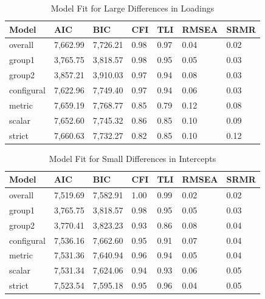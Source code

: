 \documentclass[
  man]{apa6}
\begin{document}
\begin{table}[tbp]

\begin{center}
\begin{threeparttable}

\caption{\label{tab:tab4}Model Fit for Large Differences in Loadings}

\begin{tabular}{lllllll}
\toprule
Model & AIC & BIC & CFI & TLI & RMSEA & SRMR\\
\midrule
overall & 7,662.99 & 7,726.21 & 0.98 & 0.97 & 0.04 & 0.02\\
group1 & 3,765.75 & 3,818.57 & 0.98 & 0.95 & 0.05 & 0.03\\
group2 & 3,857.21 & 3,910.03 & 0.97 & 0.94 & 0.08 & 0.03\\
configural & 7,622.96 & 7,749.40 & 0.97 & 0.94 & 0.06 & 0.03\\
metric & 7,659.19 & 7,768.77 & 0.85 & 0.79 & 0.12 & 0.08\\
scalar & 7,652.60 & 7,745.32 & 0.86 & 0.85 & 0.10 & 0.09\\
strict & 7,660.63 & 7,732.27 & 0.82 & 0.85 & 0.10 & 0.12\\
\bottomrule
\end{tabular}

\end{threeparttable}
\end{center}

\end{table}

\begin{table}[tbp]

\begin{center}
\begin{threeparttable}

\caption{\label{tab:tab5}Model Fit for Small Differences in Intercepts}

\begin{tabular}{lllllll}
\toprule
Model & AIC & BIC & CFI & TLI & RMSEA & SRMR\\
\midrule
overall & 7,519.69 & 7,582.91 & 1.00 & 0.99 & 0.02 & 0.02\\
group1 & 3,765.75 & 3,818.57 & 0.98 & 0.95 & 0.05 & 0.03\\
group2 & 3,770.41 & 3,823.23 & 0.93 & 0.86 & 0.08 & 0.04\\
configural & 7,536.16 & 7,662.60 & 0.95 & 0.91 & 0.07 & 0.04\\
metric & 7,531.36 & 7,640.94 & 0.96 & 0.94 & 0.05 & 0.04\\
scalar & 7,531.34 & 7,624.06 & 0.94 & 0.93 & 0.06 & 0.05\\
strict & 7,523.54 & 7,595.18 & 0.95 & 0.96 & 0.04 & 0.05\\
\bottomrule
\end{tabular}

\end{threeparttable}
\end{center}

\end{table}
\end{document}
